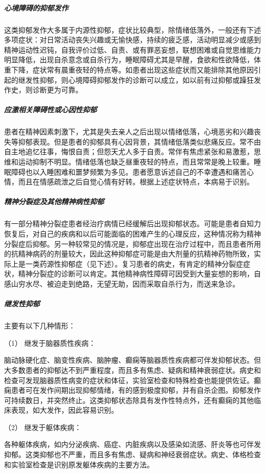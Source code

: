 \subparagraph{心境障碍的抑郁发作}

这类抑郁发作大多属于内源性抑郁，症状比较典型，除情绪低落外，一般还有下述多项症状：对日常活动丧失兴趣或无愉快感，持续的疲乏感，活动明显减少或感到精神运动性迟钝，自我评价过低、自责、或有罪恶妄想，联想困难或自觉思维能力明显降低，出现自杀意念或自杀行为，睡眠障碍尤其是早醒，食欲和性欲降低，体重下降，症状常有晨重夜轻的特点等。如患者出现这些症状而又能排除其他原因引起的继发性抑郁，则心境障碍抑郁发作的诊断可以成立，如以前有过抑郁或躁狂发作史，则诊断更为可靠。

\subparagraph{应激相关障碍性或心因性抑郁}

患者在精神因素刺激下，尤其是失去亲人之后出现以情绪低落，心境恶劣和兴趣丧失等抑郁表现。但是患者的抑郁具有心因背景，其情绪低落类似悲痛反应。常不由自主地追忆往事，悔恨自责；但怨天尤人多于自责。常伴有焦虑紧张和易激惹，思维和运动抑制不明显。情绪低落也缺乏昼重夜轻的特点，而且常常是晚上较重。睡眠障碍也以入睡困难和噩梦频繁为多见。患者愿意诉述自己的不幸遭遇和痛苦心情，而且在情感疏泄之后自觉心情有好转。根据上述症状特点，本病易于识别。

\subparagraph{精神分裂症及其他精神病性抑郁}

有一部分精神分裂症患者经治疗病情已经缓解后出现抑郁状态。可能是患者自知力恢复后，对自己的疾病和以后可能面临的困难产生的心理反应，这种情况称为精神分裂症后抑郁。另一种较常见的情况是，抑郁症出现在治疗过程中，而且患者所用的抗精神病药的剂量较大，因此这种抑郁症可能是由大剂量的抗精神药物所致，实际上是一类药源性抑郁症（见下述）。复习患者的病史，有肯定的精神分裂症症状，精神分裂症的诊断可以肯定。其他精神病性障碍可因受到大量妄想的影响，自感山穷水尽、被迫走到绝路，无望无助，因而采取自杀行为，而送来急诊。

\subparagraph{继发性抑郁}

主要有以下几种情形：

\hypertarget{text00045.htmlux5cux23CHP1-18-3-2-4-1}{}
（1） 继发于脑器质性疾病：

脑动脉硬化症、脑变性疾病、脑肿瘤、癫痫等脑器质性疾病都可伴发抑郁状态。但大多数患者的抑郁达不到严重程度，而且多有焦虑、疑病和精神衰弱症状。病史和检查可发现脑器质性病变的症状和体征，实验室检查和特殊检查也能提供佐证。癫痫患者可在发作间期出现抑郁情绪，有的感到极度抑郁，并有自杀企图。抑郁发作可持续数日，并突然终止。这类抑郁状态除具有发作性特点外，还有癫痫的其他临床表现，如大发作，因此容易识别。

\hypertarget{text00045.htmlux5cux23CHP1-18-3-2-4-2}{}
（2） 继发于躯体疾病：

各种躯体疾病，如内分泌疾病、癌症、内脏疾病以及感染如流感、肝炎等也可伴发抑郁。这类抑郁也不严重，而且多有焦虑、疑病和神经衰弱症状。病史、体格检查和实验室检查是识别原发躯体疾病的主要方法。

